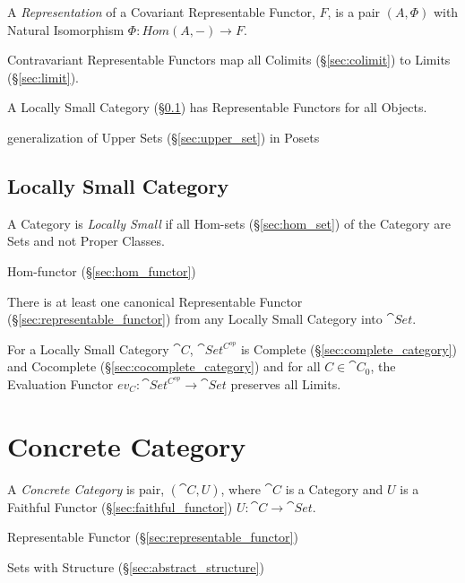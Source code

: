 A \emph{Representation} of a Covariant Representable Functor, $F$, is
a pair $(A, \Phi)$ with Natural Isomorphism $\Phi : Hom(A,-)
\rightarrow F$.

Contravariant Representable Functors map all Colimits
(\S\ref{sec:colimit}) to Limits (\S\ref{sec:limit}).

A Locally Small Category (\S\ref{sec:locally_small}) has Representable
Functors for all Objects.

generalization of Upper Sets (\S\ref{sec:upper_set}) in Posets



\subsection{Locally Small Category}\label{sec:locally_small}

A Category is \emph{Locally Small} if all Hom-sets
(\S\ref{sec:hom_set}) of the Category are Sets and not Proper Classes.

Hom-functor (\S\ref{sec:hom_functor})

There is at least one canonical Representable Functor
(\S\ref{sec:representable_functor}) from any Locally Small Category
into $\cat{Set}$.

For a Locally Small Category $\cat{C}$, $\cat{Set^{C^{op}}}$ is
Complete (\S\ref{sec:complete_category}) and Cocomplete
(\S\ref{sec:cocomplete_category}) and for all $C \in \cat{C}_0$,
the Evaluation Functor $ev_C : \cat{Set^{C^{op}}} \rightarrow
\cat{Set}$ preserves all Limits. \cite{awodey06}



\section{Concrete Category}\label{sec:concrete_category}

A \emph{Concrete Category} is pair, $(\cat{C},U)$, where $\cat{C}$ is
a Category and $U$ is a Faithful Functor
(\S\ref{sec:faithful_functor}) $U : \cat{C} \rightarrow \cat{Set}$.

Representable Functor (\S\ref{sec:representable_functor})

Sets with Structure (\S\ref{sec:abstract_structure})

